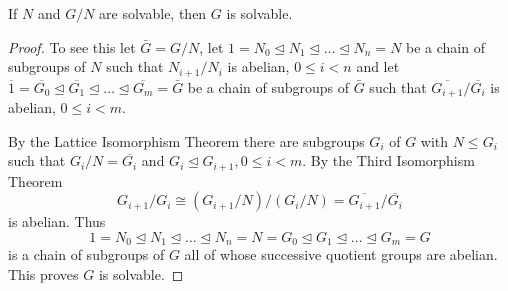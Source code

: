 \begin{theorem}
    If $N$ and $G / N$ are solvable, then $G$ is solvable.
    \begin{proof}
        To see this let $\bar{G}=G / N$, let $1=N_0 \unlhd N_1 \unlhd \ldots \unlhd N_n=N$ be a chain of subgroups of $N$ such that $N_{i+1} / N_i$ is abelian, $0 \leq i<n$ and let $\overline{1}=\overline{G_0} \unlhd \overline{G_1} \unlhd \ldots \unlhd \overline{G_m}=\bar{G}$ be a chain of subgroups of $\bar{G}$ such that $\overline{G_{i+1}} / \overline{G_i}$ is abelian, $0 \leq i<m$.

        By the Lattice Isomorphism Theorem there are subgroups $G_i$ of $G$ with $N \leq G_i$ such that $G_i / N=\overline{G_i}$ and $G_i \unlhd G_{i+1}, 0 \leq i<m$. By the Third Isomorphism Theorem
        \[
            G_{i+1} / G_i
            \cong
            \left(G_{i+1} / N\right) /\left(G_i / N\right)
            =
            \overline{G_{i+1}} / \overline{G_i}
        \]
        is abelian.
        Thus
        \[
            1=N_0 \unlhd N_1 \unlhd \ldots \unlhd N_n=N=G_0 \unlhd G_1 \unlhd \ldots \unlhd G_m=G
        \]
        is a chain of subgroups of $G$ all of whose successive quotient groups are abelian. This proves $G$ is solvable.
    \end{proof}
\end{theorem}

